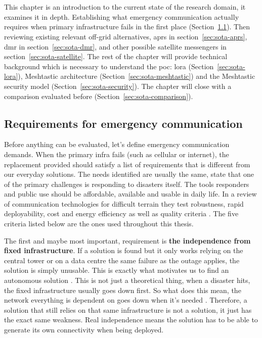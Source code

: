 \chapter{}%
\label{ch:stand-van-zaken}

This chapter is an introduction to the current state of the research domain, it examines it in depth.
Establishing what emergency communication actually requires when primary infrastructure fails in the first place (Section~\ref{sec:sota-requirements}). Then reviewing existing relevant off-grid alternatives, \gls{aprs} in section~\ref{sec:sota-aprs}, \gls{dmr} in section~\ref{sec:sota-dmr}, and other possible satellite messengers in section~\ref{sec:sota-satellite}.
The rest of the chapter will provide technical background which is necessary to understand the \gls{poc}: \gls{lora} (Section~\ref{sec:sota-lora}), Meshtastic architecture (Section~\ref{sec:sota-meshtastic}) and the Meshtastic security model (Section~\ref{sec:sota-security}).
The chapter will close with a comparison evaluated before (Section~\ref{sec:sota-comparison}).

\section{Requirements for emergency communication}%
\label{sec:sota-requirements}

Before anything can be evaluated, let's define emergency communication demands. When the primary infra fails (such as cellular or internet), the replacement provided should satisfy a list of requirements that is different from our everyday solutions.
The needs identified are usually the same, \textcite{ManojBaker2007} state that one of the primary challenges is responding to disasters itself. The tools responders and public use should be affordable, available and usable in daily life.
In a review of communication technologies for difficult terrain they test robustness, rapid deployability, cost and energy efficiency as well as quality criteria \autocite{ElKhaledMcheick2019}.
The five criteria listed below are the ones used throughout this thesis.

The first and maybe most important, requirement is \textbf{the independence from fixed infrastructure}. If a solution is found but it only works relying on the central tower or on a data centre the same failure as the outage applies, the solution is simply unusable.
This is exactly what motivates us to find an autonomous solution \autocite{ManojBaker2007}. This is not just a theoretical thing, when a disaster hits, the fixed infrastructure usually goes down first. So what does this mean, the network everything is dependent on goes down when it's needed \autocite{ManojBaker2007}.
Therefore, a solution that still relies on that same infrastructure is not a solution, it just has the exact same weakness. Real independence means the solution has to be able to generate its own connectivity when being deployed.

